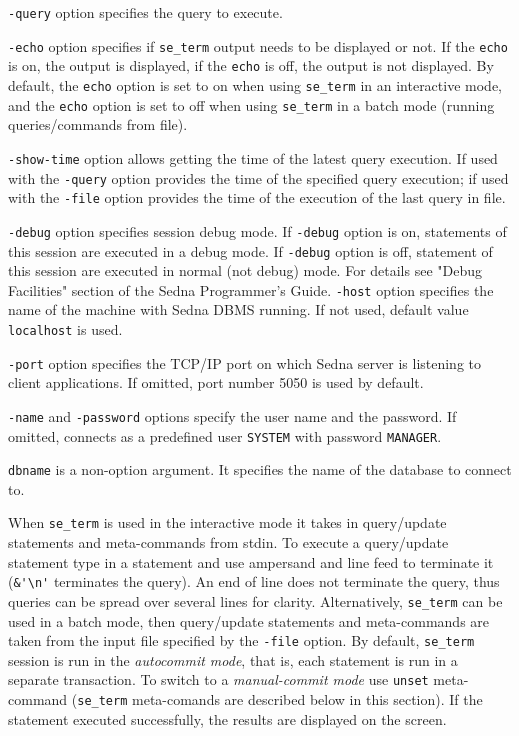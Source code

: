 \documentclass[a4paper,12pt]{article}
\begin{document}
\verb!-query! option specifies the query to execute.

\verb!-echo! option specifies if \verb!se_term! output needs to be displayed or not. If the \verb!echo! is on, the output is displayed, if the \verb!echo! is off, the output is not displayed. By default, the \verb!echo! option is set to on when using \verb!se_term! in an interactive mode, and the \verb!echo! option is set to off when using \verb!se_term! in a batch mode (running queries/commands from file).

\verb!-show-time! option allows getting the time of the latest query execution. If used with the \verb!-query! option provides the time of the specified query execution; if used with the \verb!-file! option provides the time of the execution of the last query in file.

\verb!-debug! option specifies session debug mode. If \verb!-debug! option is on, statements of this session are executed in a debug mode. If \verb!-debug! option is off, statement of this session are executed in normal (not debug) mode. For details see "Debug Facilities" section of the Sedna Programmer's Guide.
\verb!-host! option specifies the name of the machine with Sedna DBMS running. If not used, default value \verb!localhost! is used.

\verb!-port! option specifies the TCP/IP port on which Sedna server is listening to client applications. If omitted, port number 5050 is used by default.

\verb!-name! and \verb!-password! options specify the user name and the password. If omitted, connects as a predefined user \verb!SYSTEM! with password \verb!MANAGER!.

\verb!dbname! is a non-option argument. It specifies the name of the database to connect to.

When \verb!se_term! is used in the interactive mode it takes in query/update statements and meta-commands from stdin. To execute a query/update statement type in a statement and use ampersand and line feed to terminate it (\verb!&'\n'! terminates the query). An end of line does not terminate the query, thus queries can be spread over several lines for clarity. Alternatively, \verb!se_term! can be used in a batch mode, then query/update statements and meta-commands are taken from the input file specified by the \verb!-file! option. By default, \verb!se_term! session is run in the \emph{autocommit mode}, that is, each statement is run in a separate transaction. To switch to a \emph{manual-commit mode} use \verb!unset! meta-command (\verb!se_term! meta-comands are described below in this section). If the statement executed successfully, the results are displayed on the screen.
\end{document}
